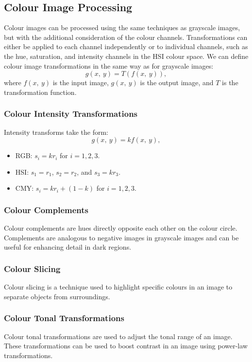 \documentclass{article}
\begin{document}
\subsection{Colour Image Processing}
Colour images can be processed using the same techniques as grayscale
images, but with the additional consideration of the colour channels.
Transformations can either be applied to each channel independently or
to individual channels, such as the hue, saturation, and intensity
channels in the HSI colour space. We can define colour image
transformations in the same way as for grayscale images:
\begin{equation*}
    g\left( x,\: y \right) = T\left( f\left( x,\: y \right) \right),
\end{equation*}
where \(f\left( x,\: y \right)\) is the input image, \(g\left( x,\: y \right)\)
is the output image, and \(T\) is the transformation function.
\subsubsection{Colour Intensity Transformations}
Intensity transforms take the form:
\begin{equation*}
    g\left( x,\: y \right) = k f\left( x,\: y \right),
\end{equation*}
\begin{itemize}
    \item RGB: \(s_i = k r_i\) for \(i = 1, 2, 3\).
    \item HSI: \(s_1 = r_1\), \(s_2 = r_2\), and \(s_3 = k r_3\).
    \item CMY: \(s_i = k r_i + \left( 1 - k \right)\) for \(i = 1, 2, 3\).
\end{itemize}
\subsubsection{Colour Complements}
Colour complements are hues directly opposite each other on the colour
circle. Complements are analogous to negative images in grayscale
images and can be useful for enhancing detail in dark regions.
\subsubsection{Colour Slicing}
Colour slicing is a technique used to highlight specific colours in an
image to separate objects from surroundings.
\subsubsection{Colour Tonal Transformations}
Colour tonal transformations are used to adjust the tonal range of an
image. These transformations can be used to boost contrast in an image
using power-law transformations.
\end{document}
